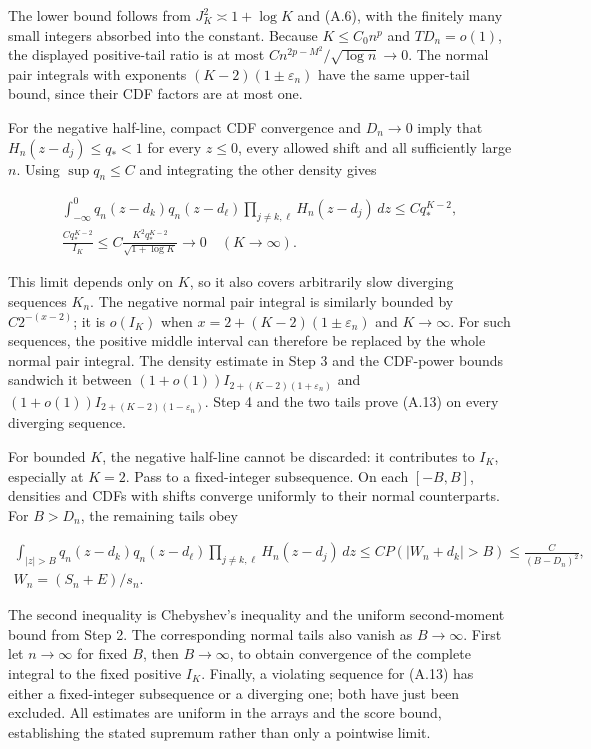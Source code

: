\documentclass{article}
\begin{document}
The lower bound follows from \(J_K^2\asymp1+\log K\) and (A.6), with the
finitely many small integers absorbed into the constant. Because
\(K\le C_0n^p\) and \(TD_n=o(1)\), the displayed positive-tail ratio is
at most \(C n^{2p-M^2}/\sqrt{\log n}\to0\). The normal pair integrals
with exponents \((K-2)(1\pm\varepsilon_n)\) have the same upper-tail
bound, since their CDF factors are at most one.

For the negative half-line, compact CDF convergence and \(D_n\to0\)
imply that \(H_n(z-d_j)\le q_*<1\) for every \(z\le0\), every allowed
shift and all sufficiently large \(n\). Using \(\sup q_n\le C\) and
integrating the other density gives

\[
\begin{gathered}
\int_{-\infty}^0q_n(z-d_k)q_n(z-d_\ell)
\prod_{j\ne k,\ell}H_n(z-d_j)\,dz\le Cq_*^{K-2},\\
\frac{Cq_*^{K-2}}{I_K}
\le C\frac{K^2q_*^{K-2}}{\sqrt{1+\log K}}\longrightarrow0
\quad(K\longrightarrow\infty).
\end{gathered}
\]

This limit depends only on \(K\), so it also covers arbitrarily slow
diverging sequences \(K_n\). The negative normal pair integral is
similarly bounded by \(C2^{-(x-2)}\); it is \(o(I_K)\) when
\(x=2+(K-2)(1\pm\varepsilon_n)\) and \(K\to\infty\). For such sequences,
the positive middle interval can therefore be replaced by the whole
normal pair integral. The density estimate in Step 3 and the CDF-power
bounds sandwich it between \((1+o(1))I_{2+(K-2)(1+\varepsilon_n)}\) and
\((1+o(1))I_{2+(K-2)(1-\varepsilon_n)}\). Step 4 and the two tails prove
(A.13) on every diverging sequence.

For bounded \(K\), the negative half-line cannot be discarded: it
contributes to \(I_K\), especially at \(K=2\). Pass to a fixed-integer
subsequence. On each \([-B,B]\), densities and CDFs with shifts converge
uniformly to their normal counterparts. For \(B>D_n\), the remaining
tails obey

\[
\begin{gathered}
\int_{|z|>B}q_n(z-d_k)q_n(z-d_\ell)
\prod_{j\ne k,\ell}H_n(z-d_j)\,dz
\le C P(|W_n+d_k|>B)\le\frac{C}{(B-D_n)^2},\\
W_n=(S_n+E)/s_n.
\end{gathered}
\]

The second inequality is Chebyshev's inequality and the uniform
second-moment bound from Step 2. The corresponding normal tails also
vanish as \(B\to\infty\). First let \(n\to\infty\) for fixed \(B\), then
\(B\to\infty\), to obtain convergence of the complete integral to the
fixed positive \(I_K\). Finally, a violating sequence for (A.13) has
either a fixed-integer subsequence or a diverging one; both have just
been excluded. All estimates are uniform in the arrays and the score
bound, establishing the stated supremum rather than only a pointwise
limit.
\end{document}
